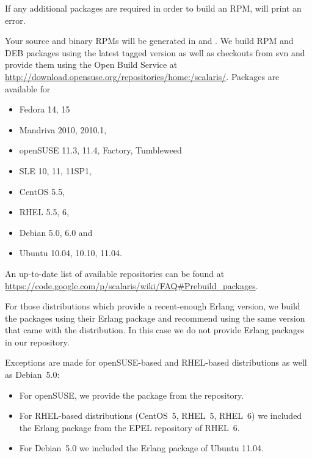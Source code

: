 If any additional packages are required in order to build an RPM,
 will print an error.

Your source and binary RPMs will be generated in
 and . We build RPM and DEB packages
using the latest tagged version as well as checkouts from svn and provide them
using the Open Build Service at
\url{http://download.opensuse.org/repositories/home:/scalaris/}. Packages
are available for

\begin{itemize}
\item Fedora 14, 15
\item Mandriva 2010, 2010.1,
\item openSUSE 11.3, 11.4, Factory, Tumbleweed
\item SLE 10, 11, 11SP1,
\item CentOS 5.5,
\item RHEL 5.5, 6,
\item Debian 5.0, 6.0 and
\item Ubuntu 10.04, 10.10, 11.04.
\end{itemize}

An up-to-date list of available repositories can be found at
\url{https://code.google.com/p/scalaris/wiki/FAQ#Prebuild_packages}.

For those distributions which provide a recent-enough Erlang version, we build
the packages using their Erlang package and recommend using the same version
that came with the distribution. In this case we do not provide Erlang packages
in our repository.

Exceptions are made for openSUSE-based and RHEL-based distributions as well as
Debian~5.0:
\begin{itemize}
  \item For openSUSE, we provide the package from the 
repository.
  \item For RHEL-based distributions (CentOS~5, RHEL~5, RHEL~6) we included the Erlang
package from the EPEL repository of RHEL~6.
  \item For Debian~5.0 we included the Erlang package of Ubuntu 11.04.
\end{itemize}
